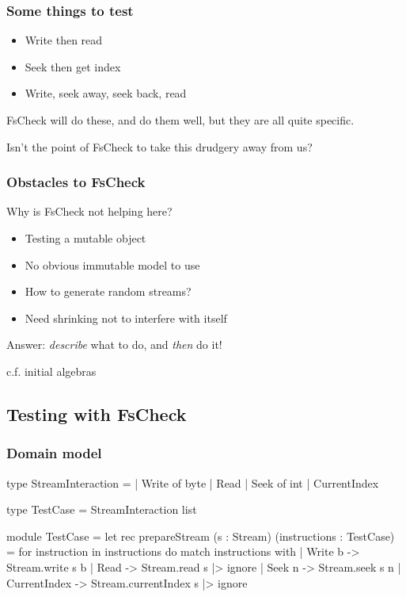 \documentclass{beamer}
\begin{document}
\begin{frame}
\frametitle{Some things to test}
\begin{itemize}
    \item Write then read
    \item Seek then get index
    \item Write, seek away, seek back, read
\end{itemize}

\hfill \break
FsCheck will do these, and do them well, but they are all quite specific.

Isn't the point of FsCheck to take this drudgery away from us?
\end{frame}

\begin{frame}
\frametitle{Obstacles to FsCheck}

Why is FsCheck not helping here?

\begin{itemize}
    \item Testing a mutable object
    \item No obvious immutable model to use
    \item How to generate random streams?
    \item Need shrinking not to interfere with itself
\end{itemize}
\end{frame}

\begin{frame}
Answer: \emph{describe} what to do, and \emph{then} do it!

\pause
\hfill \break

\tiny{c.f. initial algebras}

\end{frame}

\subsection{Testing with FsCheck}

\begin{frame}[fragile]
\frametitle{Domain model}
\begin{fslisting}
type StreamInteraction =
| Write of byte
| Read
| Seek of int
| CurrentIndex

type TestCase = StreamInteraction list
\end{fslisting}

\end{frame}
\begin{frame}[fragile]
\begin{fslisting}
[<RequireQualifiedAccess>]
module TestCase =
    let rec prepareStream
        (s : Stream)
        (instructions : TestCase)
        =
        for instruction in instructions do
            match instructions with
            | Write b ->
                Stream.write s b
            | Read ->
                Stream.read s |> ignore
            | Seek n ->
                Stream.seek s n
            | CurrentIndex ->
                Stream.currentIndex s |> ignore

\end{fslisting}
\end{frame}
\end{document}

